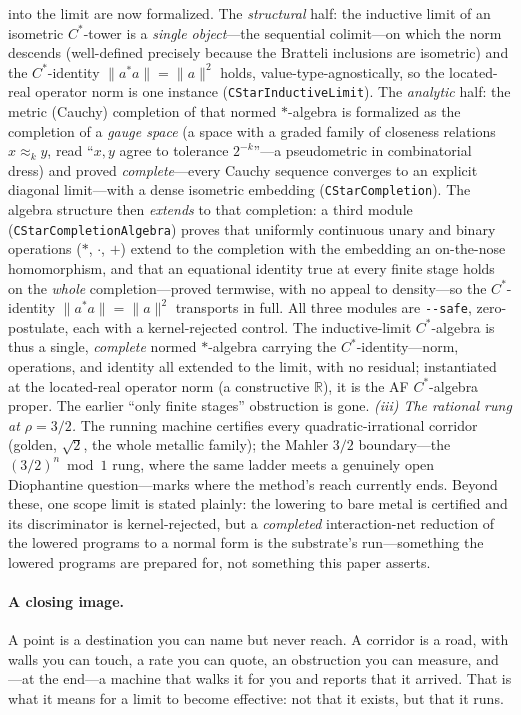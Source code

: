 \documentclass[11pt,letterpaper]{article}
\theoremstyle{plain}
\theoremstyle{definition}
\theoremstyle{remark}
\newcommand{\RR}{\mathbb{R}}
\begin{document}
into the limit are now formalized. The \emph{structural} half: the inductive limit of an
isometric $C^\ast$-tower is a \emph{single object}---the sequential colimit---on which the
norm descends (well-defined precisely because the Bratteli inclusions are isometric) and
the $C^\ast$-identity $\|a^\ast a\| = \|a\|^2$ holds, value-type-agnostically, so the
located-real operator norm is one instance (\texttt{CStarInductiveLimit}). The
\emph{analytic} half: the metric (Cauchy) completion of that normed $\ast$-algebra is
formalized as the completion of a \emph{gauge space} (a space with a graded family of
closeness relations $x \approx_k y$, read ``$x,y$ agree to tolerance $2^{-k}$''---a
pseudometric in combinatorial dress) and proved \emph{complete}---every Cauchy sequence
converges to an explicit diagonal limit---with a dense isometric embedding
(\texttt{CStarCompletion}). The algebra structure then \emph{extends} to that completion: a
third module (\texttt{CStarCompletionAlgebra}) proves that uniformly continuous unary and
binary operations ($\ast$, $\cdot$, $+$) extend to the completion with the embedding an
on-the-nose homomorphism, and that an equational identity true at every finite stage holds
on the \emph{whole} completion---proved termwise, with no appeal to density---so the
$C^\ast$-identity $\|a^\ast a\| = \|a\|^2$ transports in full. All three modules are
\texttt{-{}-safe}, zero-postulate, each with a kernel-rejected control. The inductive-limit
$C^\ast$-algebra is thus a single, \emph{complete} normed $\ast$-algebra carrying the
$C^\ast$-identity---norm, operations, and identity all extended to the limit, with no
residual; instantiated at the located-real operator norm (a constructive $\RR$), it is the
AF $C^\ast$-algebra proper. The earlier ``only finite
stages'' obstruction is gone.
\emph{(iii) The rational rung at $\rho = 3/2$.} The running machine certifies every
quadratic-irrational corridor (golden, $\sqrt2$, the whole metallic family); the
Mahler $3/2$ boundary---the $(3/2)^n \bmod 1$ rung, where the same ladder meets a
genuinely open Diophantine question---marks where the method's reach currently ends.
Beyond these, one scope limit is stated plainly: the lowering to bare metal is
certified and its discriminator is kernel-rejected, but a \emph{completed}
interaction-net reduction of the lowered programs to a normal form is the substrate's
run---something the lowered programs are prepared for, not something this paper
asserts.

\paragraph{A closing image.}
A point is a destination you can name but never reach. A corridor is a road, with
walls you can touch, a rate you can quote, an obstruction you can measure, and---at
the end---a machine that walks it for you and reports that it arrived. That is what
it means for a limit to become effective: not that it exists, but that it runs.
\end{document}
